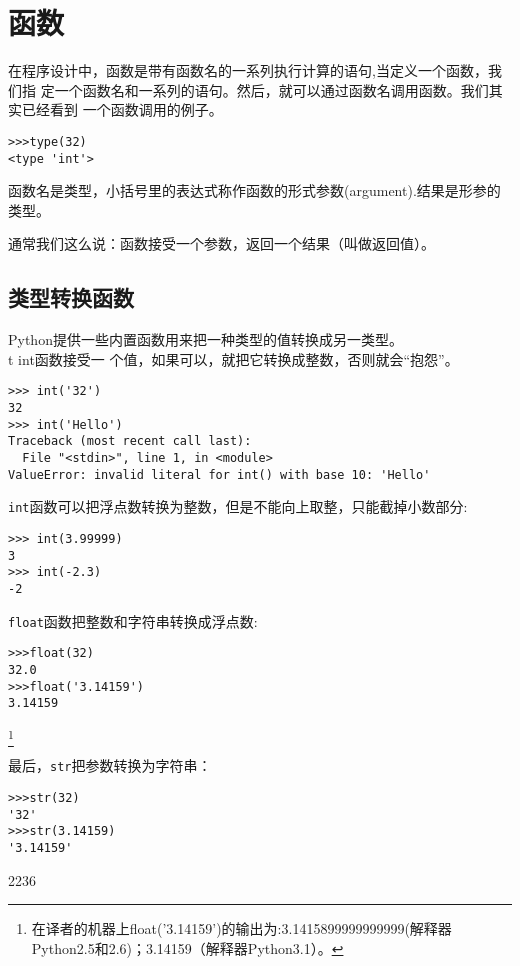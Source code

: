 \chapter{函数}
\label{funcchap}

在程序设计中，函数是带有函数名的一系列执行计算的语句,当定义一个函数，我们指
定一个函数名和一系列的语句。然后，就可以通过函数名调用函数。我们其实已经看到
一个函数调用的例子。

\beforeverb
\begin{verbatim}
>>>type(32)
<type 'int'>
\end{verbatim}
\afterverb

函数名是类型，小括号里的表达式称作函数的形式参数(argument).结果是形参的类型。


通常我们这么说：函数接受一个参数，返回一个结果（叫做返回值）。


\section{类型转换函数}

Python提供一些内置函数用来把一种类型的值转换成另一类型。{\\t int}函数接受一
个值，如果可以，就把它转换成整数，否则就会“抱怨”。


\beforeverb
\begin{verbatim}
>>> int('32')
32
>>> int('Hello')
Traceback (most recent call last):
  File "<stdin>", line 1, in <module>
ValueError: invalid literal for int() with base 10: 'Hello'
\end{verbatim}
\afterverb

{\tt int}函数可以把浮点数转换为整数，但是不能向上取整，只能截掉小数部分:

\beforeverb
\begin{verbatim}
>>> int(3.99999)
3
>>> int(-2.3)
-2
\end{verbatim}
\afterverb

{\tt float}函数把整数和字符串转换成浮点数:


\beforeverb
\begin{verbatim}
>>>float(32)
32.0
>>>float('3.14159')
3.14159
\end{verbatim}
\afterverb \footnote{在译者的机器上float('3.14159')的输出为:3.1415899999999999(解释器Python2.5和2.6)；3.14159（解释器Python3.1）。}

最后，{\tt str}把参数转换为字符串：


\beforeverb
\begin{verbatim}
>>>str(32)
'32'
>>>str(3.14159)
'3.14159'
\end{verbatim}
\afterverb

2236


